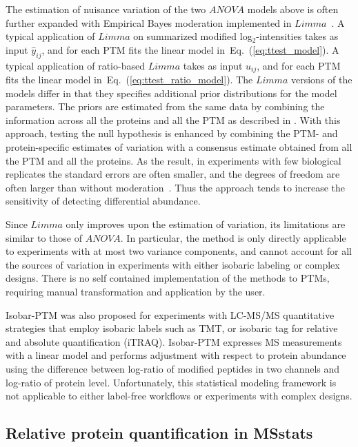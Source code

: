 \documentclass[mcp]{article}
\numberwithin{table}{section}
\def\eqref#1{Eq.~(\ref{eq:#1})}
\begin{document}
\medskip \noindent The estimation of nuisance variation of the two $ANOVA$ models above is often further expanded with Empirical Bayes moderation implemented in $Limma$~\cite{ Ritchie_15a, Schwammle2015, Smyth:2004, Smyth:2005, Zhu,Chappell:2021}. 
A typical application of $Limma$ on summarized modified log$_2$-intensities takes as input $\hat{y}_{ij}$, and for each PTM fits the linear model in~\eqref{ttest_model}. 
A typical application of ratio-based $Limma$ takes as input $u_{ij}$, and for each PTM fits the linear model in~\eqref{ttest_ratio_model}. 
The $Limma$ versions of the models differ in that they specifies additional prior distributions for the model parameters. 
The priors are estimated from the same data by combining the information across all the proteins and all the PTM as described in \cite{Smyth:2004}. 
With this approach, testing the null hypothesis is enhanced by combining the PTM- and protein-specific estimates of variation with a consensus estimate obtained from all the PTM and all the proteins.
As the result, in experiments with few biological replicates the standard errors are often smaller, and the degrees of freedom are often larger than without moderation~\cite{Ritchie_15a}. 
Thus the approach tends to increase the sensitivity of detecting differential abundance.

Since $Limma$ only improves upon the estimation of variation, its limitations are similar to those of $ANOVA$. In particular, the method is only directly applicable to experiments with at most two variance components, and cannot account for all the sources of variation in experiments with either isobaric labeling or complex designs. There is no self contained implementation of the methods to PTMs, requiring manual transformation and application by the user.

\medskip {} 

\medskip \noindent Isobar-PTM was also proposed for experiments with LC-MS/MS quantitative strategies that employ isobaric labels such as TMT, or isobaric tag for relative and absolute quantification (iTRAQ)\cite{Breitwieser:2013}. Isobar-PTM expresses MS measurements with a linear model and performs adjustment with respect to protein abundance using the difference between log-ratio of modified peptides in two channels and log-ratio of protein level. Unfortunately, this statistical modeling framework is not applicable to either label-free workflows or experiments with complex designs. 


\subsection*{Relative protein quantification in MSstats}
\end{document}
